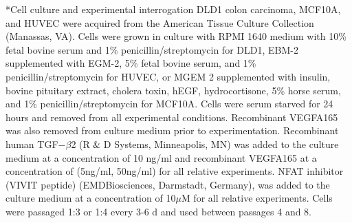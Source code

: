 \documentclass[12pt]{article}
\makeatletter
\renewcommand\subsection{\@startsection
	{subsection}{2}{0mm}
	{-0.05in}
	{-0.5\baselineskip}
	{\normalfont\normalsize\bfseries}}
\renewcommand\subsubsection{\@startsection
	{subsubsection}{2}{0mm}
	{-0.05in}
	{-0.5\baselineskip}
	{\normalfont\normalsize\itshape}}
\makeatother
\begin{document}

\subsection*{Cell culture and experimental interrogation}
DLD1 colon carcinoma, MCF10A, and HUVEC were acquired from the American Tissue Culture Collection (Manassas, VA). Cells were grown in culture with RPMI 1640 medium with 10\% fetal bovine serum and 1\% penicillin/streptomycin for DLD1, EBM-2 supplemented with EGM-2, 5\% fetal bovine serum, and 1\% penicillin/streptomycin for HUVEC, or MGEM 2 supplemented with insulin, bovine pituitary extract, cholera toxin, hEGF, hydrocortisone, 5\% horse serum, and 1\% penicillin/streptomycin for MCF10A. Cells were serum starved for 24 hours and removed from all experimental conditions.  Recombinant VEGFA165 was also removed from culture medium prior to experimentation.  Recombinant human TGF$-\beta$2 (R$\And$D Systems, Minneapolis, MN) was added to the culture medium at a concentration of 10 ng/ml and recombinant VEGFA165 at a concentration of (5ng/ml, 50ng/ml) for all relative experiments.  NFAT inhibitor (VIVIT peptide) (EMDBiosciences, Darmstadt, Germany), was added to the culture medium at a concentration of 10$\mu$M for all relative experiments.   Cells were passaged 1:3 or 1:4 every 3-6 d and used between passages 4 and 8.
\end{document}
